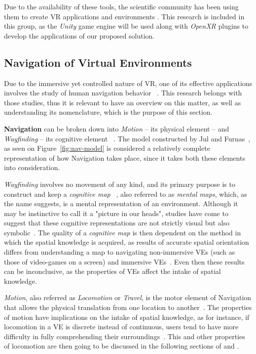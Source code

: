 Due to the availability of these tools, the scientific community has been using them to create \gls{VR} applications and environments \cite{Anthes2016}. 
This research is included in this group, as the \textit{Unity} game engine will be used along with \textit{OpenXR} plugins to develop the applications 
of our proposed solution.  

\subsection{Navigation of Virtual Environments}
\label{sec:navigation-in-ves}

Due to the immersive yet controlled nature of \gls{VR}, one of its effective applications involves the study of human navigation behavior 
~\cite{Feng2022}. This research belongs with those studies, thus it is relevant to have an overview on this matter, as well as understanding its 
nomenclature, which is the purpose of this section.

\textbf{Navigation} can be broken down into \textit{Motion} -- its physical element -- and \textit{Wayfinding} -- its cognitive element 
~\cite{Eastgate2014}. The model constructed by Jul and Furnas~\cite{Jul1997}, as seen on Figure~\ref{fig:nav-model} is considered a relatively complete representation 
of how Navigation takes place, since it takes both these elements into consideration.

\textit{Wayfinding} involves no movement of any kind, and its primary purpose is to construct and keep a \textit{cognitive map}
~\cite{Langbehn2018}, also referred to as \textit{mental maps}, which, as the name suggests, is a mental representation of an environment. 
Although it may be instinctive to call it a "picture in our heads", studies have come to suggest that these cognitive representations 
are not strictly visual but also symbolic~\cite{Eastgate2014, Warren2019}. The quality of a \textit{cognitive map} is then dependent on the 
method in which the spatial knowledge is acquired, as results of accurate spatial orientation differs from understanding a map to navigating  
non-immersive \glspl{VE} (such as those of video-games on a screen) and immersive \glspl{VE}~\cite{Eastgate2014,Santos2009}. Even then these 
results can be inconclusive, as the properties of \glspl{VE} affect the intake of spatial knowledge.

\textit{Motion}, also referred as \textit{Locomotion} or \textit{Travel}, is the motor element of Navigation that allows the physical translation 
from one location to another~\cite{Santos2009}. The properties of motion have implications on the intake of spatial knowledge, as for instance, 
if locomotion in a \gls{VE} is discrete instead of continuous, users tend to have more difficulty in fully comprehending their 
surroundings~\cite{Langbehn2018}. This 
and other properties of locomotion are then going to be discussed in the following sections of  and 
.

